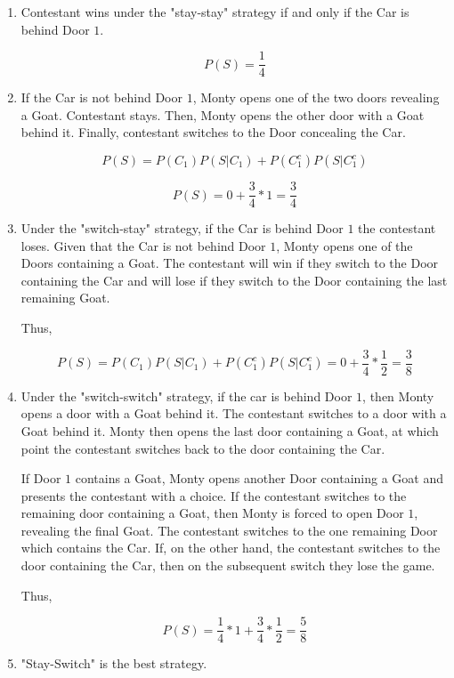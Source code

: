 \begin{enumerate}[label=(\alph*)]
\item Contestant wins under the "stay-stay" strategy if and only if the Car is
behind Door $1$.

$$P(S) = \frac{1}{4}$$

\item If the Car is not behind Door $1$, Monty opens one of the two doors
revealing a Goat. Contestant stays. Then, Monty opens the other door with a Goat
behind it. Finally, contestant switches to the Door concealing the Car.

$$P(S) = P(C_{1})P(S|C_{1}) + P(C_{1}^{c})P(S|C_{1}^{c})$$

$$P(S) = 0 + \frac{3}{4} * 1 = \frac{3}{4}$$

\item Under the "switch-stay" strategy, if the Car is behind Door $1$ the
contestant loses. Given that the Car is not behind Door $1$, Monty opens one of
the Doors containing a Goat. The contestant will win if they switch to the Door
containing the Car and will lose if they switch to the Door containing the last
remaining Goat.

Thus,

$$P(S) = P(C_{1})P(S|C_{1}) + P(C_{1}^{c})P(S|C_{1}^{c}) = 0 + \frac{3}{4} * 
\frac{1}{2} = \frac{3}{8}$$

\item Under the "switch-switch" strategy, if the car is behind Door $1$, then
Monty opens a door with a Goat behind it. The contestant switches to a door
with a Goat behind it. Monty then opens the last door containing a Goat, at
which point the contestant switches back to the door containing the Car.

If Door $1$ contains a Goat, Monty opens another Door containing a Goat and
presents the contestant with a choice. If the contestant switches to the
remaining door containing a Goat, then Monty is forced to open Door $1$,
revealing the final Goat. The contestant switches to the one remaining Door
which contains the Car. If, on the other hand, the contestant switches to the
door containing the Car, then on the subsequent switch they lose the game.

Thus,

$$P(S) = \frac{1}{4}*1 + \frac{3}{4}* \frac{1}{2} = \frac{5}{8}$$

\item "Stay-Switch" is the best strategy.
\end{enumerate}